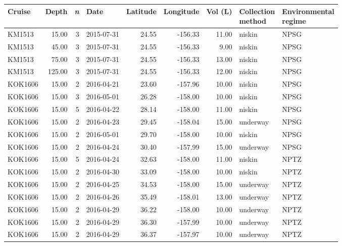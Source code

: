 \begin{table}[ht]
\centering
\begin{tabular}{lrrlrrrll}
  \hline
Cruise & Depth & \textit{n} & Date & Latitude & Longitude & Vol (L) & \makecell{Collection \\ method} & \makecell{Environmental \\ regime} \\ 
  \hline
KM1513 & 15.00 &   3 & 2015-07-31 & 24.55 & -156.33 & 11.00 & niskin & NPSG \\ 
  KM1513 & 45.00 &   3 & 2015-07-31 & 24.55 & -156.33 & 9.00 & niskin & NPSG \\ 
  KM1513 & 75.00 &   3 & 2015-07-31 & 24.55 & -156.33 & 13.00 & niskin & NPSG \\ 
  KM1513 & 125.00 &   3 & 2015-07-31 & 24.55 & -156.33 & 12.00 & niskin & NPSG \\ 
  KOK1606 & 15.00 &   2 & 2016-04-21 & 23.60 & -157.96 & 10.00 & niskin & NPSG \\ 
  KOK1606 & 15.00 &   3 & 2016-05-01 & 26.28 & -158.00 & 10.00 & niskin & NPSG \\ 
  KOK1606 & 15.00 &   5 & 2016-04-22 & 28.14 & -158.00 & 11.00 & niskin & NPSG \\ 
  KOK1606 & 15.00 &   2 & 2016-04-23 & 29.45 & -158.04 & 15.00 & underway & NPSG \\ 
  KOK1606 & 15.00 &   2 & 2016-05-01 & 29.70 & -158.00 & 10.00 & niskin & NPSG \\ 
  KOK1606 & 15.00 &   2 & 2016-04-24 & 30.40 & -157.99 & 15.00 & underway & NPSG \\ 
  KOK1606 & 15.00 &   5 & 2016-04-24 & 32.63 & -158.00 & 11.00 & niskin & NPTZ \\ 
  KOK1606 & 15.00 &   2 & 2016-04-30 & 33.09 & -158.00 & 10.00 & niskin & NPTZ \\ 
  KOK1606 & 15.00 &   2 & 2016-04-25 & 34.53 & -158.00 & 15.00 & underway & NPTZ \\ 
  KOK1606 & 15.00 &   2 & 2016-04-26 & 35.49 & -158.01 & 13.00 & underway & NPTZ \\ 
  KOK1606 & 15.00 &   2 & 2016-04-29 & 36.22 & -158.00 & 10.00 & underway & NPTZ \\ 
  KOK1606 & 15.00 &   2 & 2016-04-29 & 36.30 & -157.99 & 10.00 & underway & NPTZ \\ 
  KOK1606 & 15.00 &   2 & 2016-04-29 & 36.37 & -157.97 & 10.00 & underway & NPTZ \\ 

\end{tabular}
\end{table}
